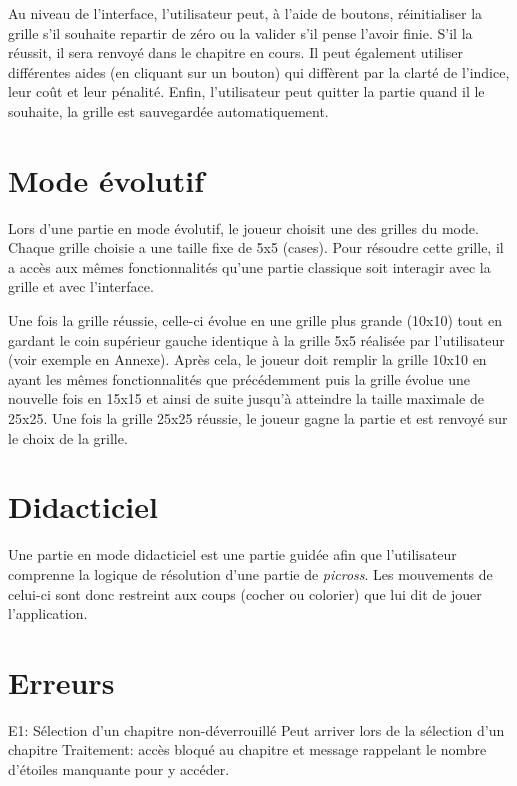 \documentclass{report}
\begin{document}
		Au niveau de l'interface, l'utilisateur peut, à l'aide de boutons, réinitialiser la grille s'il souhaite repartir de zéro ou la valider s'il pense l'avoir finie. S'il la réussit, il sera renvoyé dans le chapitre en cours. Il peut également utiliser différentes aides (en cliquant sur un bouton) qui diffèrent par la clarté de l'indice, leur coût et leur pénalité. Enfin, l'utilisateur peut quitter la partie quand il le souhaite, la grille est sauvegardée automatiquement.
	
	\section{Mode évolutif}
	
	Lors d'une partie en mode évolutif, le joueur choisit une des grilles du mode. Chaque grille choisie a une taille fixe de 5x5 (cases). Pour résoudre cette grille, il a accès aux mêmes fonctionnalités qu'une partie classique soit interagir avec la grille et avec l'interface.
	
    Une fois la grille réussie, celle-ci évolue en une grille plus grande (10x10) tout en gardant le coin supérieur gauche identique à la grille 5x5 réalisée par l'utilisateur (voir exemple en Annexe). Après cela, le joueur doit remplir la grille 10x10 en ayant les mêmes fonctionnalités que précédemment puis la grille évolue une nouvelle fois en 15x15 et ainsi de suite jusqu'à atteindre la taille maximale de 25x25. Une fois la grille 25x25 réussie, le joueur gagne la partie et est renvoyé sur le choix de la grille.
	
	
	\section{Didacticiel}
	
	Une partie en mode didacticiel est une partie guidée afin que l'utilisateur comprenne la logique de résolution d'une partie de \textit{picross}. Les mouvements de celui-ci sont donc restreint aux coups (cocher ou colorier) que lui dit de jouer l'application.
	

	\section{Erreurs}
	
		E1: Sélection d'un chapitre non-déverrouillé
			Peut arriver lors de la sélection d'un chapitre
			Traitement: accès bloqué au chapitre et message rappelant le nombre d'étoiles manquante pour y accéder.
			
\end{document}

